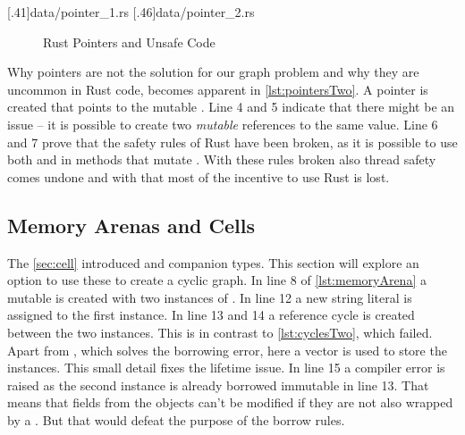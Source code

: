 \documentclass[thesis]{subfiles}
\begin{document}
    \LstTikzBox{\pointersOne}[.41\linewidth]{data/pointer_1.rs}
    \LstTikzBox{\pointersTwo}[.46\linewidth]{data/pointer_2.rs}
    \begin{figure}[ht]
      \captionsetup{type=lstlisting}
       \hfill%
      \caption{Rust Pointers and Unsafe Code}\label{lst:pointers}
    \end{figure}

    Why pointers are not the solution for our graph problem and why they are uncommon in Rust code, becomes apparent in \autoref{lst:pointersTwo}.
    A pointer  is created that points to the mutable \String {}.
    Line 4 and 5 indicate that there might be an issue -- it is possible to create two \emph{mutable} references to the same value.
    Line 6 and 7 prove that the safety rules of Rust have been broken, as it is possible to use both  and  in methods that mutate .
    With these rules broken also thread safety comes undone and with that most of the incentive to use Rust is lost.

  \subsection{Memory Arenas and Cells}\label{sec:memoryArena}
    The \autoref{sec:cell} introduced \UnsafeCellT and companion types.
    This section will explore an option to use these to create a cyclic graph.
    In line 8 of \autoref{lst:memoryArena} a mutable \Vec is created with two instances of \Node.
    In line 12 a new string literal is assigned to the first instance.
    In line 13 and 14 a reference cycle is created between the two \Foo instances.
    This is in contrast to \autoref{lst:cyclesTwo}, which failed.
    Apart from \UnsafeCellT, which solves the borrowing error, here a vector is used to store the \Node instances.
    This small detail fixes the lifetime issue.
    In line 15 a compiler error is raised as the second \Node instance is already borrowed immutable in line 13.
    That means that fields from the objects can't be modified if they are not also wrapped by a \UnsafeCellT.
    But that would defeat the purpose of the borrow rules.

\end{document}
